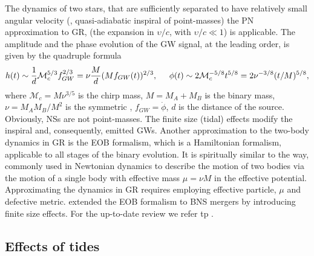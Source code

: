 The dynamics of two stars, that are sufficiently separated to have relatively small 
angular velocity (\ie, quasi-adiabatic inspiral of point-masses) 
the \ac{PN} approximation to \ac{GR}, 
(the expansion in $\upsilon/c$, with $\upsilon/c\ll 1$) is applicable.
%
The amplitude and the phase evolution of the \ac{GW} signal, at the leading order, 
is given by the quadruple formula \citep{Radice:2020ddv} 
%
\begin{equation}
\label{eq:intro:gw_wave}
h(t) \sim \frac{1}{d}\mathcal{M}_c^{5/3} f_{GW}^{2/3} = \nu\frac{M}{d}(Mf_{GW}(t))^{2/3}, \hspace{5mm} 
\phi(t) \sim 2\mathcal{M}_c^{-5/8}t^{5/8} = 2\nu^{-3/8}(t/M)^{5/8},
\end{equation}
%
where $\mathcal{M}_c = M\nu^{3/5}$ is the chirp mass, $M = M_A + M_B$ is the binary mass, 
$\nu = M_A M_B/M^2$ is the symmetric \mr{}, $f_{GW} = \dot{\phi}$, $d$ is the distance of the source.
%
Obviously, \acp{NS} are not point-masses. The finite size (tidal) effects modify the 
inspiral and, consequently, emitted \acp{GW}. 
%
%
Another approximation to the two-body dynamics in \ac{GR} is the \ac{EOB} formalism,
which is a Hamiltonian formalism, applicable to all stages of the binary evolution.
It is spiritually similar to the way, commonly used in Newtonian dynamics to 
describe the motion of two bodies via the motion of a single body with effective mass 
$\mu=\nu M$ in the effective potential. Approximating the dynamics in \ac{GR} requires 
employing effective particle, $\mu$ and defective metric. 
%
\citet{Damour:2009wj} extended the \ac{EOB} formalism to \ac{BNS} mergers by 
introducing finite size effects. For the up-to-date review we refer tp \cite{Damour:2012mv}.


\subsection{Effects of tides}

